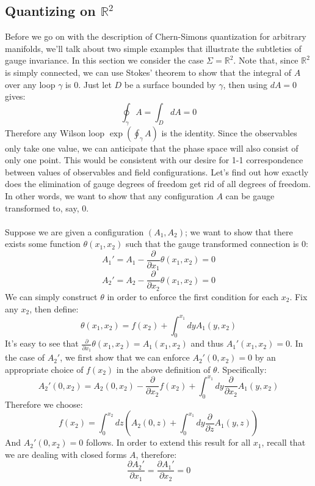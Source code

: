 \documentclass[12pt]{article}
\begin{document}
\subsection*{Quantizing on $\mathbb{R}^2$}
Before we go on with the description of Chern-Simons quantization for arbitrary manifolds, we'll talk about two simple examples that illustrate the subtleties of gauge invariance. In this section we consider the case $\Sigma = \mathbb{R}^2$. Note that, since $\mathbb{R}^2$ is simply connected, we can use Stokes' theorem to show that the integral of $A$ over any loop $\gamma$ is 0. Just let $D$ be a surface bounded by $\gamma$, then using $dA=0$ gives:
\[        \oint_{\gamma} A = \int_{D} dA = 0     \]
Therefore any Wilson loop $\exp (\oint_{\gamma} A)$ is the identity. Since the observables only take one value, we can anticipate that the phase space will also consist of only one point. This would be consistent with our desire for 1-1 correspondence between values of observables and field configurations. Let's find out how exactly does the elimination of gauge degrees of freedom get rid of all degrees of freedom. In other words, we want to show that any configuration $A$ can be gauge transformed to, say, 0.
\\
\\
Suppose we are given a configuration $(A_1, A_2)$; we want to show that there exists some function $\theta(x_1,x_2)$ such that the gauge transformed connection is 0:
\[     A_1' = A_1 - \frac{\partial}{\partial x_1} \theta(x_1, x_2)  = 0   \]
\[     A_2' = A_2 - \frac{\partial}{\partial x_2} \theta(x_1, x_2)  = 0   \]
We can simply construct $\theta$ in order to enforce the first condition for each $x_2$. Fix any $x_2$, then define:
\[  \theta(x_1, x_2) = f(x_2) + \int_0^{x_1} dy A_1(y,x_2) \]
It's easy to see that $\frac{\partial}{\partial x_1} \theta(x_1, x_2) = A_1(x_1, x_2)$ and thus $A_1'(x_1, x_2) = 0$. In the case of $A_2'$, we first show that we can enforce $A_2'(0,x_2) = 0$ by an appropriate choice of $f(x_2)$ in the above definition of $\theta$. Specifically:
\[       A_2'(0, x_2) = A_2(0, x_2) -  \frac{\partial}{\partial x_2} f(x_2) + \int_0^{x_1} dy \frac{\partial}{\partial x_2} A_1 (y,x_2)    \]
Therefore we choose:
\[      f(x_2) = \int_0^{x_2} dz \left( A_2(0,z) +  \int_0^{x_1} dy  \frac{\partial}{\partial z} A_1 (y,z) \right)   \]
And $A_2'(0, x_2) = 0$ follows. In order to extend this result for all $x_1$, recall that we are dealing with closed forms $A$, therefore:
\[    \frac{\partial A_2'}{\partial x_1} =  \frac{\partial A_1'}{\partial x_2} = 0   \]
\end{document}
